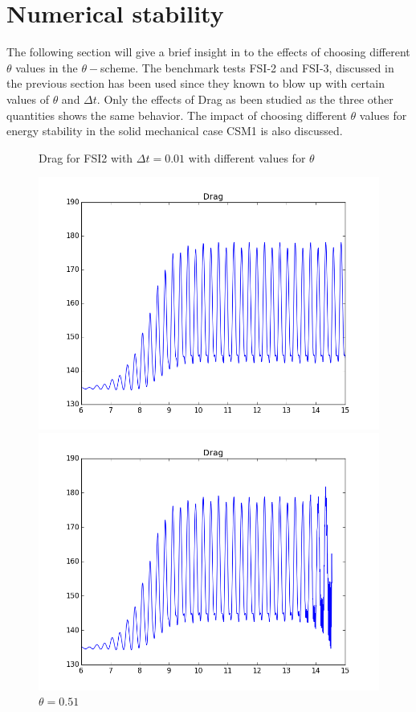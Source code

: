 \section{Numerical stability}
The following section will give a brief insight in to the effects of choosing different $\theta$ values in the $\theta-$scheme. The benchmark tests FSI-2 and FSI-3, discussed in the previous section has been used since they known to blow up with certain values of $\theta$ and $\Delta t$. Only the effects of Drag as been studied as the three other quantities shows the same behavior.   The impact of choosing different $\theta$ values for energy stability in the solid mechanical case CSM1 is also discussed.

\begin{figure}[H]  \label{fig:FSI2drag_plots} 
  \caption {Drag for FSI2 with $\Delta t = 0.01$ with different values for $\theta$}
  \begin{minipage}[b]{0.6\linewidth}
    \centering
    \includegraphics[scale=0.40]{./Temporal_stability/FSI2_001_051_big.png} 
    \caption{$\theta = 0.51 $} 
    \vspace{4ex}
  \end{minipage}%
  \begin{minipage}[b]{0.6\linewidth}
    \centering
    \includegraphics[scale=0.40]{./Temporal_stability/FSI2_001_050_big.png} 

\end{minipage}
\end{figure}
